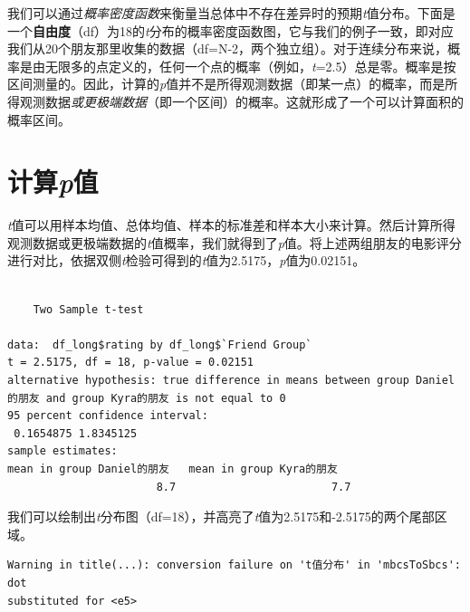 \documentclass[
  letterpaper,
  DIV=11,
  numbers=noendperiod]{scrreprt}
\newenvironment{Shaded}{\begin{snugshade}}{\end{snugshade}}
\newcommand{\AttributeTok}[1]{\textcolor[rgb]{0.40,0.45,0.13}{#1}}
\newcommand{\ConstantTok}[1]{\textcolor[rgb]{0.56,0.35,0.01}{#1}}
\newcommand{\FunctionTok}[1]{\textcolor[rgb]{0.28,0.35,0.67}{#1}}
\newcommand{\NormalTok}[1]{\textcolor[rgb]{0.00,0.23,0.31}{#1}}
\newcommand{\SpecialCharTok}[1]{\textcolor[rgb]{0.37,0.37,0.37}{#1}}
\newcommand{\StringTok}[1]{\textcolor[rgb]{0.13,0.47,0.30}{#1}}
\begin{document}
我们可以通过\emph{概率密度函数}来衡量当总体中不存在差异时的预期\emph{t}值分布。下面是一个\textbf{自由度}（df）为18的\emph{t}分布的概率密度函数图，它与我们的例子一致，即对应我们从20个朋友那里收集的数据（df=N-2，两个独立组）。对于连续分布来说，概率是由无限多的点定义的，任何一个点的概率（例如，\emph{t}=2.5）总是零。概率是按区间测量的。因此，计算的\emph{p}值并不是所得观测数据（即某一点）的概率，而是所得观测数据\emph{或更极端数据}（即一个区间）的概率。这就形成了一个可以计算面积的概率区间。

\hypertarget{ux8ba1ux7b97pux503c}{%
\section{\texorpdfstring{计算\emph{p}值}{计算p值}}\label{ux8ba1ux7b97pux503c}}

\emph{t}值可以用样本均值、总体均值、样本的标准差和样本大小来计算。然后计算所得观测数据或更极端数据的\emph{t}值概率，我们就得到了\emph{p}值。将上述两组朋友的电影评分进行对比，依据双侧\emph{t}检验可得到的\emph{t}值为2.5175，\emph{p}值为0.02151。

\begin{Shaded}
\end{Shaded}

\begin{verbatim}

    Two Sample t-test

data:  df_long$rating by df_long$`Friend Group`
t = 2.5175, df = 18, p-value = 0.02151
alternative hypothesis: true difference in means between group Daniel的朋友 and group Kyra的朋友 is not equal to 0
95 percent confidence interval:
 0.1654875 1.8345125
sample estimates:
mean in group Daniel的朋友   mean in group Kyra的朋友 
                       8.7                        7.7 
\end{verbatim}

我们可以绘制出\emph{t}分布图（df=18），并高亮了\emph{t}值为2.5175和-2.5175的两个尾部区域。

\begin{verbatim}
Warning in title(...): conversion failure on 't值分布' in 'mbcsToSbcs': dot
substituted for <e5>
\end{verbatim}
\end{document}
